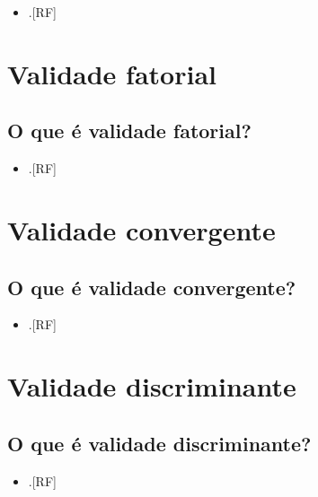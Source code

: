 \documentclass[
  a4paper,
]{book}
\providecommand{\tightlist}{%
  \setlength{\itemsep}{0pt}\setlength{\parskip}{0pt}}
\begin{document}
\begin{itemize}
\tightlist
\item
  .{[}RF{]}
\end{itemize}

\hypertarget{validade-fatorial}{%
\section{Validade fatorial}\label{validade-fatorial}}

\hypertarget{o-que-uxe9-validade-fatorial}{%
\subsection{O que é validade fatorial?}\label{o-que-uxe9-validade-fatorial}}

\begin{itemize}
\tightlist
\item
  .{[}RF{]}
\end{itemize}

\hypertarget{validade-convergente}{%
\section{Validade convergente}\label{validade-convergente}}

\hypertarget{o-que-uxe9-validade-convergente}{%
\subsection{O que é validade convergente?}\label{o-que-uxe9-validade-convergente}}

\begin{itemize}
\tightlist
\item
  .{[}RF{]}
\end{itemize}

\hypertarget{validade-discriminante}{%
\section{Validade discriminante}\label{validade-discriminante}}

\hypertarget{o-que-uxe9-validade-discriminante}{%
\subsection{O que é validade discriminante?}\label{o-que-uxe9-validade-discriminante}}

\begin{itemize}
\tightlist
\item
  .{[}RF{]}
\end{itemize}
\end{document}
